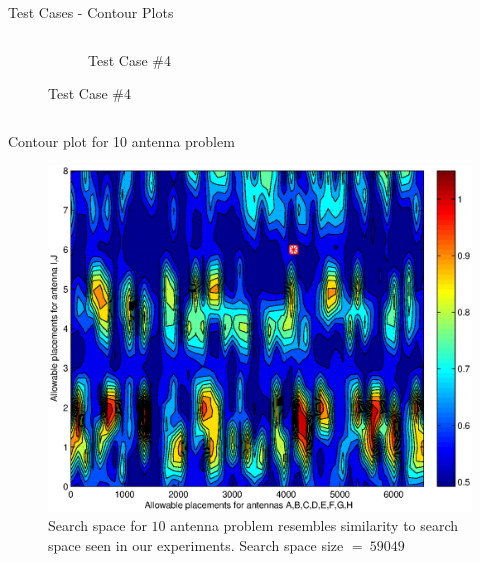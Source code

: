 \documentclass{beamer}
\begin{document}
\begin{frame}{Test Cases - Contour Plots}
\begin{columns}
\begin{column}{.5\columnwidth}
\begin{figure}
\begin{subfigure}{\columnwidth}
                    \vspace*{-0.2cm}
                    \caption*{\tiny Test Case \#4}%
                \end{subfigure}\hfill%
            \end{figure}

        \end{column}
    \end{columns}
\end{frame}


\begin{frame}{Contour plot for 10 antenna problem}
 \begin{figure}
     \vspace*{-.2cm}
\centering
    \includegraphics[scale=0.5]{../paper/FIG/tc5_contour}%
    \vspace*{-.1cm}
     \caption*{\tiny Search space for $10$ antenna problem resembles similarity to search space seen in our experiments. Search space size $=~59049$}
\end{figure}
\end{frame}
\end{document}
